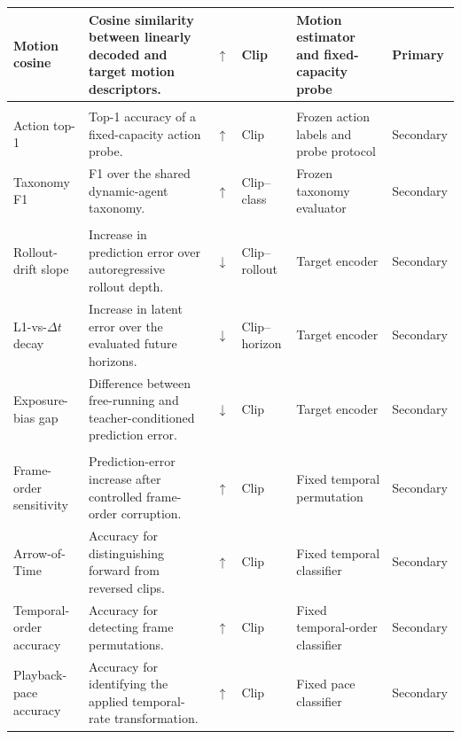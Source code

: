 \begin{table}[t]
\begin{tabularx}{\textwidth}{
    p{}
    p{}
    p{}
    p{}
    p{}
    X
}
Motion cosine
&
Cosine similarity between linearly decoded and target motion
descriptors.
&
\(\uparrow\)
&
Clip
&
Motion estimator and fixed-capacity probe
&
Primary
\\

\midrule
\rowcolor{AttrBlue}
\multicolumn{6}{l}{\textbf{Semantic diagnostics}}
\\
\midrule

Action top-1
&
Top-1 accuracy of a fixed-capacity action probe.
&
\(\uparrow\)
&
Clip
&
Frozen action labels and probe protocol
&
Secondary
\\

Taxonomy F1
&
F1 over the shared dynamic-agent taxonomy.
&
\(\uparrow\)
&
Clip--class
&
Frozen taxonomy evaluator
&
Secondary
\\

\midrule
\rowcolor{AttrGold}
\multicolumn{6}{l}{\textbf{Prediction-stability diagnostics}}
\\
\midrule

Rollout-drift slope
&
Increase in prediction error over autoregressive rollout depth.
&
\(\downarrow\)
&
Clip--rollout
&
Target encoder
&
Secondary
\\

L1-vs-\(\Delta t\) decay
&
Increase in latent error over the evaluated future horizons.
&
\(\downarrow\)
&
Clip--horizon
&
Target encoder
&
Secondary
\\

Exposure-bias gap
&
Difference between free-running and teacher-conditioned prediction
error.
&
\(\downarrow\)
&
Clip
&
Target encoder
&
Secondary
\\

\midrule
\rowcolor{AttrGray}
\multicolumn{6}{l}{\textbf{Temporal diagnostics}}
\\
\midrule

Frame-order sensitivity
&
Prediction-error increase after controlled frame-order corruption.
&
\(\uparrow\)
&
Clip
&
Fixed temporal permutation
&
Secondary
\\

Arrow-of-Time
&
Accuracy for distinguishing forward from reversed clips.
&
\(\uparrow\)
&
Clip
&
Fixed temporal classifier
&
Secondary
\\

Temporal-order accuracy
&
Accuracy for detecting frame permutations.
&
\(\uparrow\)
&
Clip
&
Fixed temporal-order classifier
&
Secondary
\\

Playback-pace accuracy
&
Accuracy for identifying the applied temporal-rate transformation.
&
\(\uparrow\)
&
Clip
&
Fixed pace classifier
&
Secondary
\\


\end{tabularx}
\end{table}
